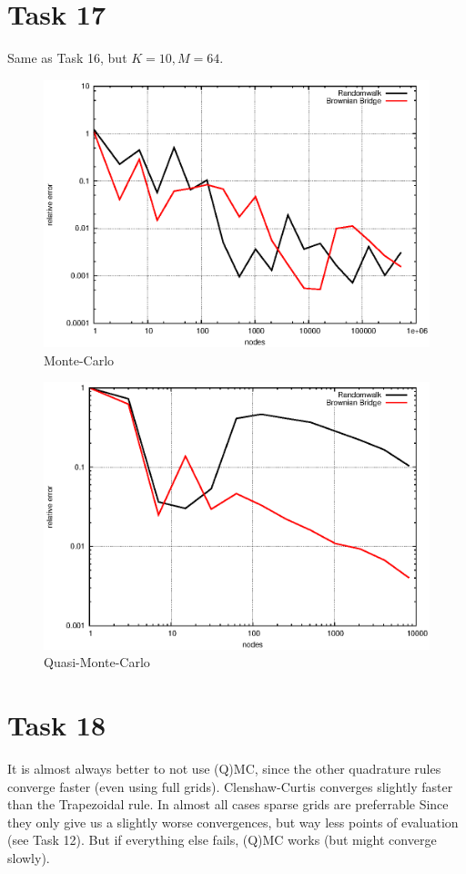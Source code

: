 \documentclass[]{article}
\begin{document}
\section*{Task 17}
Same as Task 16, but $K=10,M=64$.
\begin{figure}[!ht]
\includegraphics{task17_mc}
\caption{Monte-Carlo}
\label{fig:Task17a}
\end{figure}

\begin{figure}[!ht]
\includegraphics{task17_qmc}
\caption{Quasi-Monte-Carlo}
\label{fig:Task17b}
\end{figure}
\clearpage



\section*{Task 18} It is almost always better to not use (Q)MC, since the other
quadrature rules converge faster (even using full grids). Clenshaw-Curtis
converges slightly faster than the Trapezoidal rule. In almost all cases sparse
grids are preferrable Since they only give us a slightly worse convergences, but
way less points of evaluation (see Task 12). But if everything else fails, (Q)MC
works (but might converge slowly).
\end{document}
